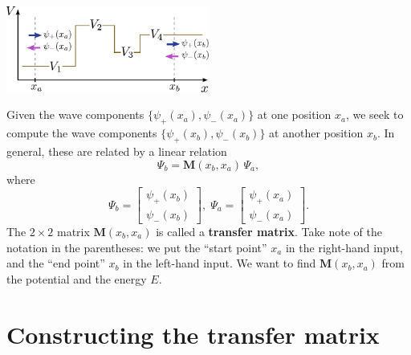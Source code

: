 \documentclass[prx,12pt]{revtex4-2}
\begin{document}
\begin{center}
  \includegraphics[width=0.5\textwidth]{transfer_matrix_setup}
\end{center}

\noindent
Given the wave components $\{\psi_+(x_a),\psi_-(x_a)\}$ at one
position $x_a$, we seek to compute the wave components
$\{\psi_+(x_b),\psi_-(x_b)\}$ at another position $x_b$.  In general,
these are related by a linear relation
\begin{equation}
  \Psi_b = \mathbf{M}(x_b,x_a) \, \Psi_a,
\end{equation}
where
\begin{equation}
  \Psi_b = \begin{bmatrix}\psi_+(x_b) \\ \psi_-(x_b)\end{bmatrix}, \; \Psi_a = \begin{bmatrix}\psi_+(x_a) \\ \psi_-(x_a)\end{bmatrix}.
\end{equation}
The $2\times2$ matrix $\mathbf{M}(x_b,x_a)$ is called a
\textbf{transfer matrix}.  Take note of the notation in the
parentheses: we put the ``start point'' $x_a$ in the right-hand input,
and the ``end point'' $x_b$ in the left-hand input.  We want to find
$\mathbf{M}(x_b,x_a)$ from the potential and the energy $E$.

\section{Constructing the transfer matrix}
\end{document}
